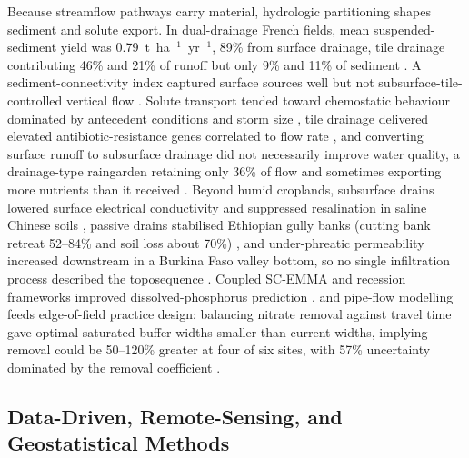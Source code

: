 Because streamflow pathways carry material, hydrologic partitioning shapes sediment and solute export. In dual-drainage French fields, mean suspended-sediment yield was 0.79~t~ha$^{-1}$~yr$^{-1}$, 89\% from surface drainage, tile drainage contributing 46\% and 21\% of runoff but only 9\% and 11\% of sediment \parencite{Gaillot2023b,Grangeon2021}. A sediment-connectivity index captured surface sources well but not subsurface-tile-controlled vertical flow \parencite{Calsamiglia2018}. Solute transport tended toward chemostatic behaviour dominated by antecedent conditions and storm size \parencite{Stops2022}, tile drainage delivered elevated antibiotic-resistance genes correlated to flow rate \parencite{Rieke2018}, and converting surface runoff to subsurface drainage did not necessarily improve water quality, a drainage-type raingarden retaining only 36\% of flow and sometimes exporting more nutrients than it received \parencite{Xu2022}. Beyond humid croplands, subsurface drains lowered surface electrical conductivity and suppressed resalination in saline Chinese soils \parencite{Yan2013,Chang2012}, passive drains stabilised Ethiopian gully banks (cutting bank retreat 52--84\% and soil loss about 70\%) \parencite{Zegeye2021}, and under-phreatic permeability increased downstream in a Burkina Faso valley bottom, so no single infiltration process described the toposequence \parencite{Keita2014}. Coupled SC-EMMA and recession frameworks improved dissolved-phosphorus prediction \parencite{Nazari2021}, and pipe-flow modelling feeds edge-of-field practice design: balancing nitrate removal against travel time gave optimal saturated-buffer widths smaller than current widths, implying removal could be 50--120\% greater at four of six sites, with 57\% uncertainty dominated by the removal coefficient \parencite{McEachran2020}.

\subsection{Data-Driven, Remote-Sensing, and Geostatistical Methods}

